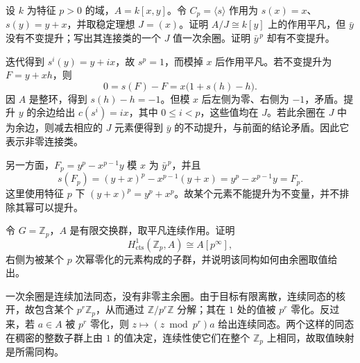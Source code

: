 \begin{exercise}\label{b4:ex:11-modular-polynomial-lift}
	设 \(k\) 为特征 \(p>0\) 的域，\(A=k[x,y]\)。令 \(C_p=\langle s\rangle\) 作用为 \(s(x)=x\)、\(s(y)=y+x\)，并取稳定理想 \(J=(x)\)。证明 \(A/J\cong k[y]\) 上的作用平凡，但 \(\bar y\) 没有不变提升；写出其连接类的一个 \(J\) 值一次余圈。证明 \(\bar y^{\,p}\) 却有不变提升。
\end{exercise}
\begin{solution}
	迭代得到 \(s^i(y)=y+ix\)，故 \(s^p=1\)，而模掉 \(x\) 后作用平凡。若不变提升为 \(F=y+xh\)，则
	\[
		0=s(F)-F=x\bigl(1+s(h)-h\bigr).
	\]
	因 \(A\) 是整环，得到 \(s(h)-h=-1\)。但模 \(x\) 后左侧为零、右侧为 \(-1\)，矛盾。提升 \(y\) 的余边给出 \(c(s^i)=ix\)，其中 \(0\le i<p\)，这些值均在 \(J\)。若此余圈在 \(J\) 中为余边，则减去相应的 \(J\) 元素便得到 \(\bar y\) 的不动提升，与前面的结论矛盾。因此它表示非零连接类。

	另一方面，\(F_p=y^p-x^{p-1}y\) 模 \(x\) 为 \(\bar y^{\,p}\)，并且
	\[
		s(F_p)=(y+x)^p-x^{p-1}(y+x)=y^p-x^{p-1}y=F_p.
	\]
	这里使用特征 \(p\) 下 \((y+x)^p=y^p+x^p\)。故某个元素不能提升为不变量，并不排除其幂可以提升。
\end{solution}

\begin{exercise}\label{b4:ex:11-continuous-characters}
	令 \(G=\mathbb Z_p\)，\(A\) 是有限交换群，取平凡连续作用。证明
	\[
		H_{\mathrm{cts}}^1(\mathbb Z_p,A)\cong A[p^\infty],
	\]
	右侧为被某个 \(p\) 次幂零化的元素构成的子群，并说明该同构如何由余圈取值给出。
\end{exercise}
\begin{solution}
	一次余圈是连续加法同态，没有非零主余圈。由于目标有限离散，连续同态的核开，故包含某个 \(p^r\mathbb Z_p\)，从而通过 \(\mathbb Z/p^r\mathbb Z\) 分解；其在 \(1\) 处的值被 \(p^r\) 零化。反过来，若 \(a\in A\) 被 \(p^r\) 零化，则 \(z\mapsto(z\bmod p^r)a\) 给出连续同态。两个这样的同态在稠密的整数子群上由 \(1\) 的值决定，连续性使它们在整个 \(\mathbb Z_p\) 上相同，故取值映射是所需同构。
\end{solution}

